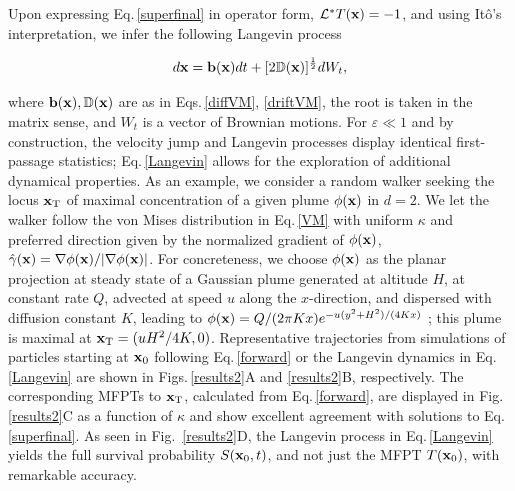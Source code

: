 \documentclass[
 reprint,










 amsmath,amssymb,
 aps, prl,






longbibliography
]{revtex4-2}
\newcommand\bx{ {\bf x}}
\begin{document}
\noindent
Upon expressing Eq.\,\ref{superfinal} in operator form,
${\cal L^*} T{(\bf x)} = -1$, and using  Itô's interpretation, we infer the following
Langevin process



\begin{equation}\label{Langevin}
d\bx = { \bf b}(\bx)dt + [2\mathbb{D}(\bx)]^{\frac12}dW_t,
\end{equation}

where ${\bf b(\bx)}, \mathbb{D}(\bx)$ are as in
Eqs.\,\ref{diffVM}, \ref{driftVM},
the root is taken in the matrix sense, and $W_t$ is a vector of
Brownian motions.
For $\varepsilon \ll 1$ and by construction,
the velocity jump and Langevin processes
display identical first-passage statistics;  Eq.\,\ref{Langevin}
allows for the exploration of additional dynamical properties.
As an example, we consider
a random walker
seeking the locus ${\bf x}_{\rm T}$ of maximal concentration of a given plume $\phi(\bf x)$ in $d=2$.
We let the walker follow the von Mises distribution in Eq.\,\ref{VM} with uniform $\kappa$ and
preferred direction given by the normalized gradient
of $\phi({\bf x})$,  $\hat \gamma(\bf x) =  \nabla \phi(\bf x) /  |\nabla \phi(\bf x) | $.
For concreteness,
we choose $\phi({\bf x})$ as the planar projection at steady state of a
Gaussian plume generated at altitude $H$, at constant rate $Q$, advected at speed $u$ along the $x$-direction, and dispersed with diffusion constant $K$, leading to $\phi{(\bf x)} = Q / (2 \pi K x) e^{- u (y^2 + H^2) / (4 K x)}$ \cite{Stokie2011};
this plume is maximal at ${\bf{x}}_{\rm T} = (u H^2 / 4 K,0)$.
Representative trajectories from simulations of particles starting at
${\bf x}_{0}$ following Eq.\,\ref{forward} or the Langevin dynamics in Eq.\,\ref{Langevin} are shown in Figs.\,\ref{results2}A and \ref{results2}B, respectively. The corresponding MFPTs to ${\bf x}_{\rm T}$, calculated from
Eq.\,\ref{forward},
are displayed in Fig.\,\ref{results2}C as a function of $\kappa$ and
show excellent agreement with solutions to Eq.\,\ref{superfinal}.
As seen in Fig.~\ref{results2}D,
the Langevin process in Eq.\,\ref{Langevin} yields the full survival probability $S({{\bf {x}}_0}, t)$,
and not just the MFPT $T({\bf x}_0)$, with remarkable accuracy.
\end{document}
